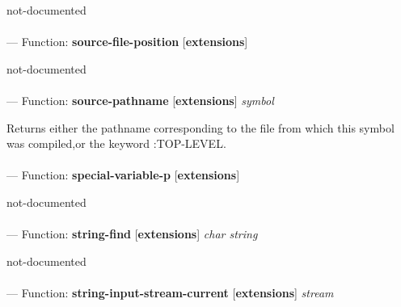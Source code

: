 \begin{adjustwidth}{5em}{5em}
not-documented
\end{adjustwidth}

\paragraph{}
\label{EXTENSIONS:SOURCE-FILE-POSITION}
--- Function: \textbf{source-file-position} [\textbf{extensions}] \textit{}

\begin{adjustwidth}{5em}{5em}
not-documented
\end{adjustwidth}

\paragraph{}
\label{EXTENSIONS:SOURCE-PATHNAME}
--- Function: \textbf{source-pathname} [\textbf{extensions}] \textit{symbol}

\begin{adjustwidth}{5em}{5em}
Returns either the pathname corresponding to the file from which this symbol was compiled,or the keyword :TOP-LEVEL.
\end{adjustwidth}

\paragraph{}
\label{EXTENSIONS:SPECIAL-VARIABLE-P}
--- Function: \textbf{special-variable-p} [\textbf{extensions}] \textit{}

\begin{adjustwidth}{5em}{5em}
not-documented
\end{adjustwidth}

\paragraph{}
\label{EXTENSIONS:STRING-FIND}
--- Function: \textbf{string-find} [\textbf{extensions}] \textit{char string}

\begin{adjustwidth}{5em}{5em}
not-documented
\end{adjustwidth}

\paragraph{}
\label{EXTENSIONS:STRING-INPUT-STREAM-CURRENT}
--- Function: \textbf{string-input-stream-current} [\textbf{extensions}] \textit{stream}

